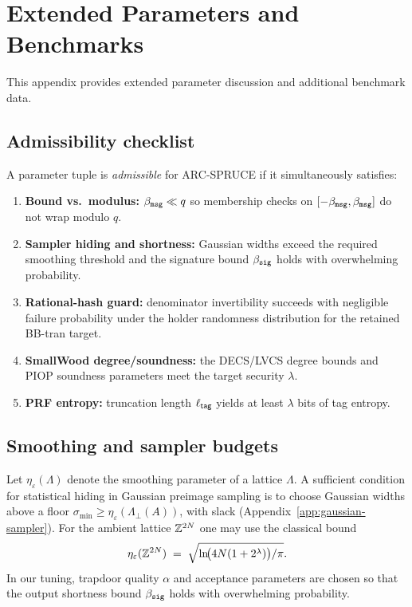 \section{Extended Parameters and Benchmarks}
\label{app:ext-params}

This appendix provides extended parameter discussion and additional benchmark data.

\subsection{Admissibility checklist}
A parameter tuple is \emph{admissible} for ARC-SPRUCE if it simultaneously satisfies:
\begin{enumerate}[leftmargin=1.25em]
  \item \textbf{Bound vs.\ modulus:} \(\beta_{\mathtt{msg}} \ll q\) so membership checks on \([-\beta_{\mathtt{msg}},\beta_{\mathtt{msg}}]\) do not wrap modulo \(q\).
  \item \textbf{Sampler hiding and shortness:} Gaussian widths exceed the required smoothing threshold and the signature
  bound \(\beta_{\mathtt{sig}}\) holds with overwhelming probability.
  \item \textbf{Rational-hash guard:} denominator invertibility succeeds with negligible failure probability under the
  holder randomness distribution for the retained BB-tran target.
  \item \textbf{SmallWood degree/soundness:} the DECS/LVCS degree bounds and PIOP soundness parameters meet the target
  security \(\lambda\).
  \item \textbf{PRF entropy:} truncation length \(\ell_{\mathsf{tag}}\) yields at least \(\lambda\) bits of tag entropy.
\end{enumerate}

\subsection{Smoothing and sampler budgets}
Let \(\eta_\varepsilon(\Lambda)\) denote the smoothing parameter of a lattice \(\Lambda\). A sufficient condition for
statistical hiding in Gaussian preimage sampling is to choose Gaussian widths above a floor
\(\sigma_{\min}\ge \eta_\varepsilon(\Lambda_\perp(A))\), with slack (Appendix~\ref{app:gaussian-sampler}).
For the ambient lattice \(\mathbb{Z}^{2N}\) one may use the classical bound
\[
  \eta_\varepsilon(\mathbb{Z}^{2N})
  \;=\;
  \sqrt{\ln\!\bigl(4N(1+2^\lambda)\bigr)/\pi}.
\]
In our tuning, trapdoor quality \(\alpha\) and acceptance parameters are chosen so that the output shortness bound
\(\beta_{\mathtt{sig}}\) holds with overwhelming probability.

